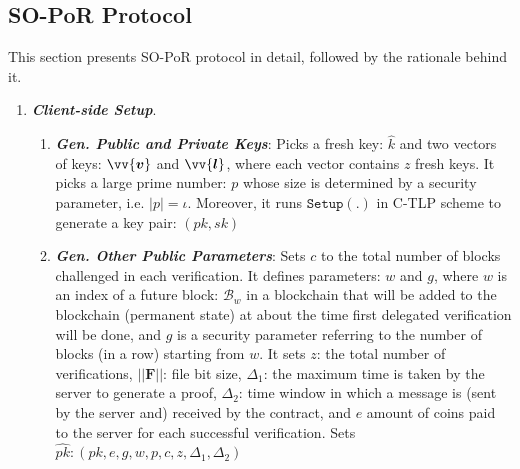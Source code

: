 %

\subsection{SO-PoR Protocol}\label{SO-PoR-Protocol}
This section presents SO-PoR protocol in detail, followed by the rationale behind it.      





\begin{enumerate}[leftmargin=.46cm]

\item\textit{\textbf{Client-side Setup}}. 



\begin{enumerate}


\item  \textbf{\textit{\small {Gen. Public and Private Keys}}}:   Picks a fresh key: $\hat{k}$ and two vectors of keys: $\vv{\bm{v}}$ and $\vv{\bm{l}}$, where each vector contains $z$ fresh keys. It picks a large prime number:  $p$ whose size is determined by a security parameter, i.e. $|p|=\iota$.  Moreover, it runs $\mathtt{Setup}(.)$ in  C-TLP scheme to generate a key pair: $(pk, sk)$

\item \textbf{\textit{\small {Gen. Other Public Parameters}}}:  Sets $c$ to the total number of blocks challenged in each verification. It defines  parameters: $w$ and $g$, where  $w$ is an index  of a future block: $\mathcal {B}_{\scriptscriptstyle w}$ in a blockchain that will be added to the blockchain (permanent state) at about the time  first delegated verification will  be done, and $g$ is  a security parameter referring to the number of blocks (in a row) starting from  $w$.  It  sets $z$: the total number of verifications,  $||{\bm{F}}||$: file bit size, $\Delta_{\scriptscriptstyle 1}$:  the maximum time  is taken by the server to generate a proof, $\Delta_{\scriptscriptstyle 2}$: time window in which a message is (sent by the server and) received by the contract, and $e$ amount of coins paid to the server for each successful  verification. Sets $\hat{pk}: (pk,e,g,w,p,c,z,\Delta_{\scriptscriptstyle 1},\Delta_{\scriptscriptstyle 2})$ 



\end{enumerate}
\end{enumerate}
